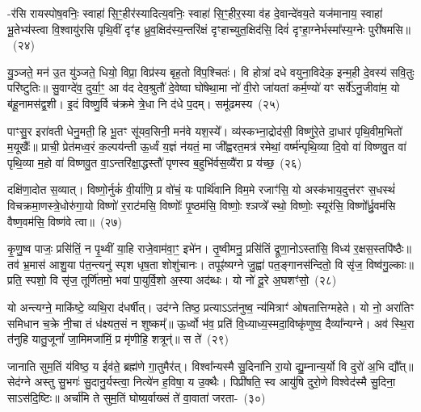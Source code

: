 -र॑सि रायस्पोष॒वनिः॒ स्वाहा॑ सि॒ꣳ॒हीर॑स्यादित्य॒वनिः॒ स्वाहा॑ सि॒ꣳ॒हीर॒स्या व॑ह दे॒वान्दे॑वय॒ते यज॑मानाय॒ स्वाहा॑ भू॒तेभ्य॑स्त्वा वि॒श्वायु॑रसि पृथि॒वीं दृꣳ॑ह ध्रुव॒क्षिद॑स्य॒न्तरि॑क्षं दृꣳहाच्युत॒क्षिद॑सि॒ दिवं॑ दृꣳहा॒ग्नेर्भस्मा᳚स्य॒ग्नेः पुरी॑षमसि॥~(२४)

{\anuvakamend[{नाम॑ सुप्रजा॒वनिः॒ स्वाहा॑ सि॒ꣳ॒हीः पञ्च॑त्रिꣳशच्च}]}%

यु॒ञ्जते॒ मन॑ उ॒त यु॑ञ्जते॒ धियो॒ विप्रा॒ विप्र॑स्य बृह॒तो वि॑प॒श्चितः॑। वि होत्रा॑ दधे वयुना॒विदेक॒ इन्म॒ही दे॒वस्य॑ सवि॒तुः परि॑ष्टुतिः॥ सु॒वाग्दे॑व॒ दुर्या॒ꣳ॒ आ व॑द देव॒श्रुतौ॑ दे॒वेष्वा घो॑षेथा॒मा नो॑ वी॒रो जा॑यतां कर्म॒ण्यो॑ यꣳ सर्वे॑\-ऽनु॒जीवा॑म॒ यो ब॑हू॒नामस॑द्व॒शी। इ॒दं विष्णु॒र्वि च॑क्रमे त्रे॒धा नि द॑धे प॒दम्। समू॑ढमस्य~(२५)

पाꣳसु॒र इरा॑वती धेनु॒मती॒ हि भू॒तꣳ सू॑यव॒सिनी॒ मन॑वे यश॒स्ये᳚। व्य॑स्कभ्ना॒द्रोद॑सी॒ विष्णु॑रे॒ते दा॒धार॑ पृथि॒वीम॒भितो॑ म॒यूखैः᳚॥ प्राची॒ प्रेत॑मध्व॒रं क॒ल्पय॑न्ती ऊ॒र्ध्वं य॒ज्ञं न॑यतं॒ मा जी᳚ह्वरत॒मत्र॑ रमेथां॒ वर्ष्म॑न्पृथि॒व्या दि॒वो वा॑ विष्णवु॒त वा॑ पृथि॒व्या म॒हो वा॑ विष्णवु॒त वा॒\-ऽन्तरि॑क्षा॒द्धस्तौ॑ पृणस्व ब॒हुभि॑र्वस॒व्यै॑रा प्र य॑च्छ॒~(२६)

दक्षि॑णा॒दोत स॒व्यात्। विष्णो॒र्नुकं॑ वी॒र्या॑णि॒ प्र वो॑चं॒ यः पार्थि॑वानि विम॒मे रजाꣳ॑सि॒ यो अस्क॑भाय॒दुत्त॑रꣳ स॒धस्थं॑ विचक्रमा॒णस्त्रे॒धोरु॑गा॒यो विष्णो॑ र॒राट॑मसि॒ विष्णोः᳚ पृ॒ष्ठम॑सि॒ विष्णोः॒ श्ञप्त्रे᳚ स्थो॒ विष्णोः॒ स्यूर॑सि॒ विष्णो᳚र्ध्रु॒वम॑सि वैष्ण॒वम॑सि॒ विष्ण॑वे त्वा॥~(२७)

{\anuvakamend[{अ॒स्य॒ य॒च्छैका॒न्नच॑त्वारि॒ꣳ॒शच्च॑}]}%

कृ॒णु॒ष्व पाजः॒ प्रसि॑तिं॒ न पृ॒थ्वीं या॒हि राजे॒वाम॑वा॒ꣳ॒ इभे॑न। तृ॒ष्वीमनु॒ प्रसि॑तिं द्रूणा॒नो\-ऽस्ता॑सि॒ विध्य॑ र॒क्षस॒स्तपि॑ष्ठैः॥ तव॑ भ्र॒मास॑ आशु॒या प॑त॒न्त्यनु॑ स्पृश धृष॒ता शोशु॑चानः। तपूꣴ॑ष्यग्ने जु॒ह्वा॑ पत॒ङ्गानस॑न्दितो॒ वि सृ॑ज॒ विष्व॑गु॒ल्काः॥ प्रति॒ स्पशो॒ वि सृ॑ज॒ तूर्णि॑तमो॒ भवा॑ पा॒युर्वि॒शो अ॒स्या अद॑ब्धः। यो नो॑ दू॒रे अ॒घशꣳ॑सो॒~(२८)

यो अन्त्यग्ने॒ माकि॑ष्टे॒ व्यथि॒रा द॑धर्षीत्। उद॑ग्ने तिष्ठ॒ प्रत्या\-ऽ\-ऽत॑नुष्व॒ न्य॑मित्राꣳ॑ ओषतात्तिग्महेते। यो नो॒ अरा॑तिꣳ समिधान च॒क्रे नी॒चा तं ध॑क्ष्यत॒सं न शुष्कम्᳚॥ ऊ॒र्ध्वो भ॑व॒ प्रति॑ वि॒ध्याध्य॒स्मदा॒विष्कृ॑णुष्व॒ दैव्या᳚न्यग्ने। अव॑ स्थि॒रा त॑नुहि यातु॒जूनां᳚ जा॒मिमजा॑मिं॒ प्र मृ॑णीहि॒ शत्रून्॑॥ स ते॑~(२९)

जानाति सुम॒तिं य॑विष्ठ॒ य ईव॑ते॒ ब्रह्म॑णे गा॒तुमैर॑त्। विश्वा᳚न्यस्मै सु॒दिना॑नि रा॒यो द्यु॒म्नान्य॒र्यो वि दुरो॑ अ॒भि द्यौ᳚त्॥ सेद॑ग्ने अस्तु सु॒भगः॑ सु॒दानु॒र्यस्त्वा॒ नित्ये॑न ह॒विषा॒ य उ॒क्थैः। पिप्री॑षति॒ स्व आयु॑षि दुरो॒णे विश्वेद॑स्मै सु॒दिना॒ सा\-ऽस॑दि॒ष्टिः॥ अर्चा॑मि ते सुम॒तिं घोष्य॒र्वाख्सं ते॑ वा॒वाता॑ जरता-~(३०)

